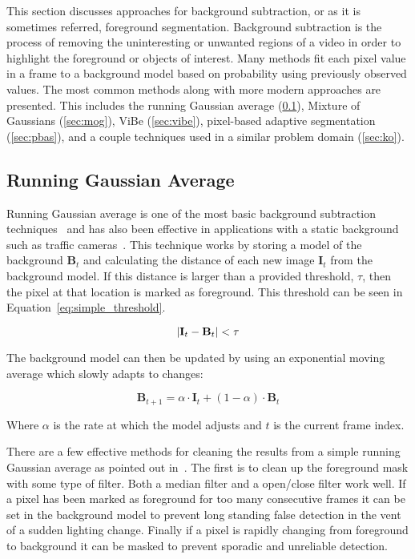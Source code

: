 This section discusses approaches for background subtraction, or as it is sometimes referred, foreground segmentation. Background subtraction is the process of removing the uninteresting or unwanted regions of a video in order to highlight the foreground or objects of interest. Many methods fit each pixel value in a frame to a background model based on probability using previously observed values. The most common methods along with more modern approaches are presented. This includes the running Gaussian average (\ref{sec:running_gaussian_average}), Mixture of Gaussians (\ref{sec:mog}), ViBe (\ref{sec:vibe}), pixel-based adaptive segmentation (\ref{sec:pbas}), and a couple techniques used in a similar problem domain (\ref{sec:ko}).


\subsection{Running Gaussian Average}
\label{sec:running_gaussian_average}
Running Gaussian average is one of the most basic background subtraction techniques~\cite{mcivor_2000_background, piccardi_2004_background} and has also been effective in applications with a static background such as traffic cameras~\cite{koller_1994_towards, heikkila_2004_real}. This technique works by storing a model of the background $\textbf{B}_t$ and calculating the distance of each new image $\textbf{I}_t$ from the background model. If this distance is larger than a provided threshold, $\tau$, then the pixel at that location is marked as foreground. This threshold can be seen in Equation~\ref{eq:simple_threshold}.

\begin{equation}
    \left|\textbf{I}_t - \textbf{B}_t\right| < \tau
    \label{eq:simple_threshold}
\end{equation}

The background model can then be updated by using an exponential moving average which slowly adapts to changes:

\begin{equation}
    \textbf{B}_{t+1} = \alpha \cdot \textbf{I}_t + (1-\alpha) \cdot \textbf{B}_t
    \label{eq:running_gaussian_average}
\end{equation}

Where $\alpha$ is the rate at which the model adjusts and $t$ is the current frame index.

There are a few effective methods for cleaning the results from a simple running Gaussian average as pointed out in~\cite{mcivor_2000_background}. The first is to clean up the foreground mask with some type of filter. Both a median filter and a open/close filter work well. If a pixel has been marked as foreground for too many consecutive frames it can be set in the background model to prevent long standing false detection in the vent of a sudden lighting change. Finally if a pixel is rapidly changing from foreground to background it can be masked to prevent sporadic and unreliable detection.


